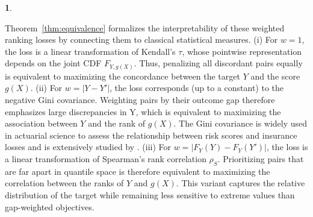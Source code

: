 \documentclass[11pt]{article}
\theoremstyle{plain}
\newtheorem{remark}{\protect\remarkname}
\theoremstyle{plain}
\theoremstyle{plain}
\theoremstyle{plain}
\newtheorem{theorem}{\protect\theoremname}
\theoremstyle{plain}
\theoremstyle{plain}
\theoremstyle{plain}
\providecommand{\remarkname}{Remark}
\providecommand{\theoremname}{Theorem}
\begin{document}
\begin{theorem}

\end{theorem}
Theorem~\ref{thm:equivalence} formalizes the interpretability of these weighted ranking losses by connecting them to classical statistical measures. (i) For $w=1$, the loss is a linear transformation of Kendall's $\tau$, whose pointwise representation depends on the joint CDF $F_{Y,g(X)}$. Thus, penalizing all discordant pairs equally is equivalent to maximizing the concordance between the target $Y$ and the score $g(X)$. (ii) For $w=|Y-Y'|$, the loss corresponds (up to a constant) to the negative Gini covariance. Weighting pairs by their outcome gap therefore emphasizes large discrepancies in Y, which is equivalent to maximizing the association between $Y$ and the rank of $g(X)$. The Gini covariance is widely used in actuarial science to assess the relationship between risk scores and insurance losses and is extensively studied by \citet{yitzhaki2012more}. (iii) For $w = |F_Y(Y) - F_Y(Y')|$, the loss is a linear transformation of Spearman's rank correlation $\rho_S$. Prioritizing pairs that are far apart in quantile space is therefore equivalent to maximizing the correlation between the ranks of $Y$ and $g(X)$. This variant captures the relative distribution of the target while remaining less sensitive to extreme values than gap-weighted objectives.

\end{document}
